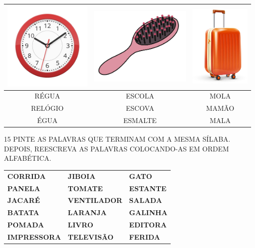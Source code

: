 \begin{center}
\begin{tabular}{ccc}
\multicolumn{1}{l}{\includegraphics[width=.3\textwidth]{media/image74.png}} & \multicolumn{1}{l}{\includegraphics[width=.3\textwidth]{media/image75.png} } & \multicolumn{1}{l}{\includegraphics[width=.3\textwidth]{media/image76.png}} \\ \hline
\multicolumn{1}{|c|}{RÉGUA} & \multicolumn{1}{c|}{ESCOLA} & \multicolumn{1}{c|}{MOLA} \\ \hline
\multicolumn{1}{|c|}{RELÓGIO} & \multicolumn{1}{c|}{ESCOVA} & \multicolumn{1}{c|}{MAMÃO} \\ \hline
\multicolumn{1}{|c|}{ÉGUA} & \multicolumn{1}{c|}{ESMALTE} & \multicolumn{1}{c|}{MALA} \\ \hline
\end{tabular}
\end{center}



\num{15} PINTE AS PALAVRAS QUE TERMINAM COM A MESMA 
SÍLABA. DEPOIS, REESCREVA AS PALAVRAS COLOCANDO-AS EM ORDEM 
ALFABÉTICA.
\begin{longtable}[]{@{}lll@{}}
\toprule
\Large\textbf{CORRIDA} & \Large\textbf{JIBOIA} & \Large\textbf{GATO}\tabularnewline
\Large\textbf{PANELA} & \Large\textbf{TOMATE} & \Large\textbf{ESTANTE}\tabularnewline
\Large\textbf{JACARÉ} & \Large\textbf{VENTILADOR} & \Large\textbf{SALADA}\tabularnewline
\Large\textbf{BATATA} & \Large\textbf{LARANJA} & \Large\textbf{GALINHA}\tabularnewline
\Large\textbf{POMADA} & \Large\textbf{LIVRO} & \Large\textbf{EDITORA}\tabularnewline
\Large\textbf{IMPRESSORA} & \Large\textbf{TELEVISÃO} & \Large\textbf{FERIDA}\tabularnewline
\bottomrule
\end{longtable}

